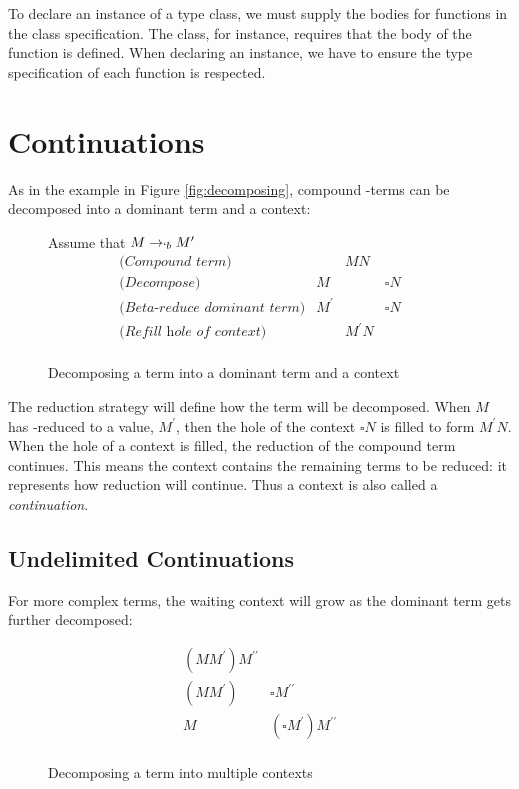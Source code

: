   To declare an instance of a type class, we must supply the bodies for functions in the class specification.
  The  class, for instance, requires that the body of the  function is defined.
  When declaring an instance, we have to ensure the type specification of each function is respected.
  
\section{Continuations}
 
  As in the example in Figure \ref{fig:decomposing}, 
  compound \lam-terms can be decomposed into a dominant term and a context:
  
  \begin{figure}[!h]
    \hspace{1cm}Assume that $M \rightarrow_{`b} M^\prime$
    \[
    \begin{array}{lrcl}
    \textit{(Compound term)}&& MN \\
    \textit{(Decompose)}&M && \square N \\
    \textit{(Beta-reduce dominant term)}& M^\prime && \square N \\
    \textit{(Refill hole of context)}&& M^\prime N \\
    \end{array}
    \]
  \caption{Decomposing a term into a dominant term and a context}
  \end{figure}
  
  The reduction strategy will define how the term will be decomposed.
  When $M$ has \bta-reduced to a value, $M^\prime$, then the hole of the context $\square N$ is filled to form $M^\prime N$. 
  When the hole of a context is filled, the reduction of the compound term continues.
  This means the context contains the remaining terms to be reduced: it represents how reduction will continue. 
  Thus a context is also called a \emph{continuation}.
 
  \subsection{Undelimited Continuations} 
 
  For more complex terms, the waiting context will grow as the dominant
  term gets further decomposed:
  
  \begin{figure}[!h]
    \[
    \begin{array}{ll}
      (MM^\prime) M^{\prime\prime} \\
      (MM^\prime) & \square M^{\prime\prime} \\
      M & (\square M^\prime) M^{\prime\prime} \\
    \end{array}
    \]
  \caption{Decomposing a term into multiple contexts}
  \end{figure}

